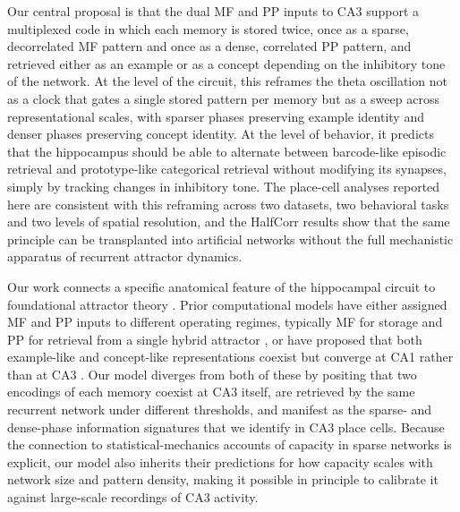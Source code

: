 \documentclass[11pt]{article}
\begin{document}
Our central proposal is that the dual MF and PP inputs to CA3 support a
multiplexed code in which each memory is stored twice, once as a sparse,
decorrelated MF pattern and once as a dense, correlated PP pattern, and
retrieved either as an example or as a concept depending on the inhibitory
tone of the network. At the level of the circuit, this reframes the theta
oscillation not as a clock that gates a single stored pattern per memory
but as a sweep across representational scales, with sparser phases
preserving example identity and denser phases preserving concept identity.
At the level of behavior, it predicts that the hippocampus should be able
to alternate between barcode-like episodic retrieval and prototype-like
categorical retrieval without modifying its synapses, simply by tracking
changes in inhibitory tone. The place-cell analyses reported here are
consistent with this reframing across two datasets, two behavioral tasks
and two levels of spatial resolution, and the HalfCorr results show that
the same principle can be transplanted into artificial networks without
the full mechanistic apparatus of recurrent attractor dynamics.

Our work connects a specific anatomical feature of the hippocampal circuit
to foundational attractor theory
\cite{hopfield1982neural,tsodyks1988enhanced,amit1985spin}. Prior
computational models have either assigned MF and PP inputs to different
operating regimes, typically MF for storage and PP for retrieval from a
single hybrid attractor \cite{treves1992computational}, or have proposed
that both example-like and concept-like representations coexist but
converge at CA1 rather than at CA3 \cite{schapiro2017complementary}. Our
model diverges from both of these by positing that two encodings of each
memory coexist at CA3 itself, are retrieved by the same recurrent network
under different thresholds, and manifest as the sparse- and dense-phase
information signatures that we identify in CA3 place cells. Because the
connection to statistical-mechanics accounts of capacity in sparse networks
is explicit, our model also inherits their predictions for how capacity
scales with network size and pattern density, making it possible in
principle to calibrate it against large-scale recordings of CA3 activity.
\end{document}
